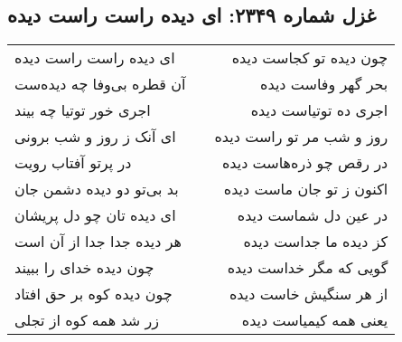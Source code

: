 \begin{center}
\section*{غزل شماره ۲۳۴۹: ای دیده راست راست دیده}
\label{sec:2349}
\begin{longtable}{l p{0.5cm} r}
ای دیده راست راست دیده
&&
چون دیده تو کجاست دیده
\\
آن قطره بی‌وفا چه دیده‌ست
&&
بحر گهر وفاست دیده
\\
اجری خور توتیا چه بیند
&&
اجری ده توتیاست دیده
\\
ای آنک ز روز و شب برونی
&&
روز و شب مر تو راست دیده
\\
در پرتو آفتاب رویت
&&
در رقص چو ذره‌هاست دیده
\\
بد بی‌تو دو دیده دشمن جان
&&
اکنون ز تو جان ماست دیده
\\
ای دیده تان چو دل پریشان
&&
در عین دل شماست دیده
\\
هر دیده جدا جدا از آن است
&&
کز دیده ما جداست دیده
\\
چون دیده خدای را ببیند
&&
گویی که مگر خداست دیده
\\
چون دیده کوه بر حق افتاد
&&
از هر سنگیش خاست دیده
\\
زر شد همه کوه از تجلی
&&
یعنی همه کیمیاست دیده
\\
\end{longtable}
\end{center}
